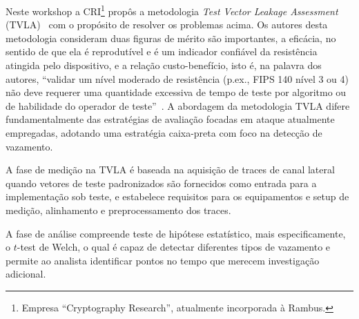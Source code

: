 
Neste workshop a CRI\footnote{Empresa ``Cryptography Research'', atualmente incorporada à Rambus.} propôs a metodologia \textit{Test Vector Leakage Assessment} (TVLA)~\cite{Goodwill2011} com o propósito de resolver os problemas acima. Os autores desta metodologia consideram duas figuras de mérito são importantes, a eficácia, no sentido de que ela é reprodutível e é um indicador confiável da resistência atingida pelo dispositivo, e a relação custo-benefício, isto é, na palavra dos autores, ``validar um nível moderado de resistência (p.ex., FIPS 140 nível 3 ou 4) não deve requerer uma quantidade excessiva de tempo de teste por algoritmo ou de habilidade do operador de teste''~\cite{Goodwill2011}. A abordagem da metodologia TVLA difere fundamentalmente das estratégias de avaliação focadas em ataque atualmente empregadas, adotando uma estratégia caixa-preta com foco na detecção de vazamento.

A fase de medição na TVLA é baseada na aquisição de traces de canal lateral quando vetores de teste padronizados são fornecidos como entrada para a implementação sob teste, e estabelece requisitos para os equipamentos e setup de medição, alinhamento e preprocessamento dos traces.

A fase de análise compreende teste de hipótese estatístico, mais especificamente, o $t$-test de Welch, o qual é capaz de detectar diferentes tipos de vazamento e permite ao analista identificar pontos no tempo que merecem investigação adicional.

